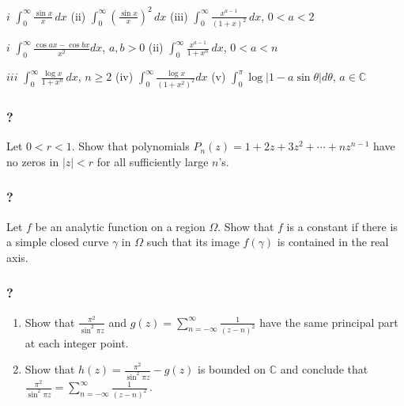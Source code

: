 \(i\) \(\displaystyle \int_0^\infty \frac{\sin x}{x} \, dx\) (ii)
\(\displaystyle \int_0^\infty (\frac{\sin x}{x})^2 \, dx\) (iii)
\(\displaystyle \int_0^\infty \frac{x^{a-1}}{(1 + x)^2} \, dx\),
\(0< a < 2\)

\(i\) \(\displaystyle \int_0^\infty \frac{\cos a x - \cos bx}{x^2} dx\),
\(a, b >0\) (ii)
\(\displaystyle \int_0^\infty \frac{x^{a-1}}{1 + x^n} \, dx\),
\(0< a < n\)

\(iii\) \(\displaystyle \int_0^\infty \frac{\log x}{1 + x^n} \, dx\),
\(n \geq 2\) (iv)
\(\displaystyle \int_0^\infty \frac{\log x}{(1 + x^2)^2} dx\) (v)
\(\displaystyle \int_0^{\pi} \log|1 - a \sin \theta| d \theta\),
\(a \in \mathbb C\)

\hypertarget{section-171}{%
\subsubsection{?}\label{section-171}}

Let \(0<r<1\). Show that polynomials
\(P_n(z) = 1 + 2z + 3 z^2 + \cdots + n z^{n-1}\) have no zeros in
\(|z|<r\) for all sufficiently large \(n\)'s.

\hypertarget{section-172}{%
\subsubsection{?}\label{section-172}}

Let \(f\) be an analytic function on a region \(\Omega\). Show that
\(f\) is a constant if there is a simple closed curve \(\gamma\) in
\(\Omega\) such that its image \(f(\gamma)\) is contained in the real
axis.

\hypertarget{section-173}{%
\subsubsection{?}\label{section-173}}

\begin{enumerate}
\def\labelenumi{(\arabic{enumi})}
\item
  Show that \(\displaystyle \frac{\pi^2}{\sin^2 \pi z}\) and
  \(\displaystyle g(z) = \sum_{n = - \infty}^{ \infty} \frac{1}{(z-n)^2}\)
  have the same principal part at each integer point.
\item
  Show that \(\displaystyle h(z) = \frac{\pi^2}{\sin^2 \pi z} - g(z)\)
  is bounded on \(\mathbb C\) and conclude that
  \(\displaystyle \frac{\pi^2}{\sin^2 \pi z} = \sum_{n = - \infty}^{ \infty} \frac{1}{(z-n)^2} \, .\)
\end{enumerate}


